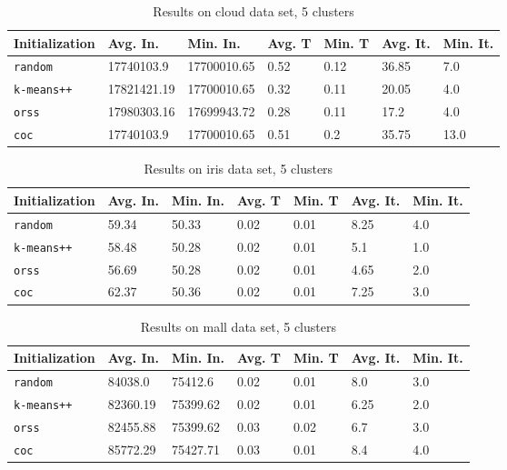\documentclass[twoside, 11pt]{article}
\begin{document}
		\begin{table}[p]
			\begin{center}
				\begin{tabular}{|l|l|l|l|l|l|l|}
					\hline
					Initialization & Avg. In. & Min. In. & Avg. T & Min. T & Avg. It. & Min. It.\\\hline
					\texttt{random} & 17740103.9 & 17700010.65 & 0.52 & 0.12 & 36.85 & 7.0\\\hline
					\texttt{k-means++} & 17821421.19 & 17700010.65 & 0.32 & 0.11 & 20.05 & 4.0\\\hline
					\texttt{orss} & 17980303.16 & 17699943.72 & 0.28 & 0.11 & 17.2 & 4.0\\\hline
					\texttt{coc} & 17740103.9 & 17700010.65 & 0.51 & 0.2 & 35.75 & 13.0\\\hline
				\end{tabular}
				\caption{Results on cloud data set, 5 clusters}
				\label{tbl:cloud5}
			\end{center}
		\end{table}
		
		\begin{table}[p]
			\begin{center}
				\begin{tabular}{|l|l|l|l|l|l|l|}
					\hline
					Initialization & Avg. In. & Min. In. & Avg. T & Min. T & Avg. It. & Min. It.\\\hline
					\texttt{random} & 59.34 & 50.33 & 0.02 & 0.01 & 8.25 & 4.0\\\hline
					\texttt{k-means++} & 58.48 & 50.28 & 0.02 & 0.01 & 5.1 & 1.0\\\hline
					\texttt{orss} & 56.69 & 50.28 & 0.02 & 0.01 & 4.65 & 2.0\\\hline
					\texttt{coc} & 62.37 & 50.36 & 0.02 & 0.01 & 7.25 & 3.0\\\hline
				\end{tabular}
				\caption{Results on iris data set, 5 clusters}
				\label{tbl:iris5}
			\end{center}
		\end{table}
		
		\begin{table}[p]
			\begin{center}
				\begin{tabular}{|l|l|l|l|l|l|l|}
					\hline
					Initialization & Avg. In. & Min. In. & Avg. T & Min. T & Avg. It. & Min. It.\\\hline
					\texttt{random} & 84038.0 & 75412.6 & 0.02 & 0.01 & 8.0 & 3.0\\\hline
					\texttt{k-means++} & 82360.19 & 75399.62 & 0.02 & 0.01 & 6.25 & 2.0\\\hline
					\texttt{orss} & 82455.88 & 75399.62 & 0.03 & 0.02 & 6.7 & 3.0\\\hline
					\texttt{coc} & 85772.29 & 75427.71 & 0.03 & 0.01 & 8.4 & 4.0\\\hline
				\end{tabular}
				\caption{Results on mall data set, 5 clusters}
				\label{tbl:mall5}
			\end{center}
		\end{table}
		
\end{document}
